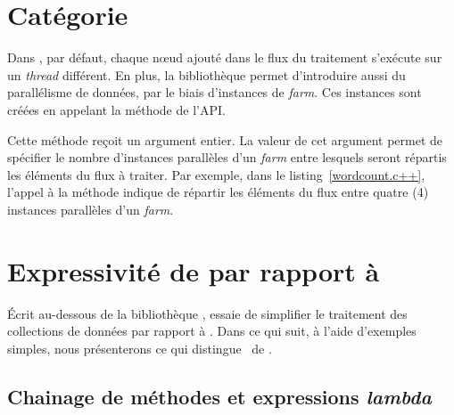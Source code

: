 \section{Cat\'egorie }

\label{execution.sect}


Dans , par d\'efaut, chaque nœud ajout\'e dans le flux du traitement s'ex\'ecute sur un \emph{thread} diff\'erent. En plus, la biblioth\`eque  permet d'introduire aussi du parall\'elisme de données, par le biais d'instances de \emph{farm}. Ces instances sont cr\'e\'ees en appelant la m\'ethode  de l’API.  

Cette méthode reçoit un argument entier.
%
La valeur de cet argument permet de sp\'ecifier le nombre d'instances parall\`eles d'un \emph{farm} entre lesquels seront r\'epartis les \'el\'ements du flux \`a traiter. Par exemple, dans le listing~\ref{wordcount.c++}, l'appel \`a la m\'ethode  indique de r\'epartir les \'el\'ements du flux entre quatre (4) instances parall\`eles d'un \emph{farm}.


\section{Expressivit\'e de  par rapport à }

\label{PpFfExpressivities.sect}




\'Ecrit au-dessous de la biblioth\`eque ,  essaie de simplifier le traitement des collections de donn\'ees par rapport à . Dans ce qui suit, à l'aide d'exemples simples, nous pr\'esenterons ce qui distingue \ppff\ de .





\subsection*{Chainage de m\'ethodes et expressions \emph{lambda}}


